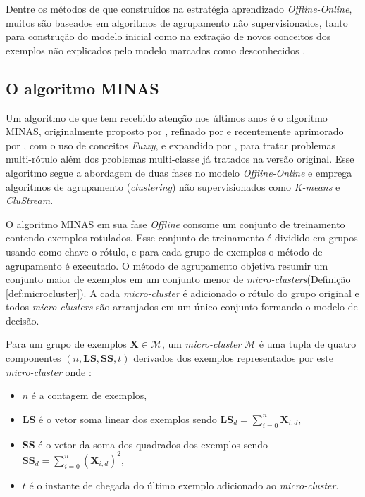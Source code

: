 Dentre os métodos de \nd que construídos na estratégia aprendizado \emph{Offline-Online},
muitos são baseados em
algoritmos de agrupamento não supervisionados, tanto
para construção do modelo inicial como na extração de novos conceitos dos
exemplos não explicados pelo modelo marcados como desconhecidos
\cite{Spinosa2009ollinda,Masud2010ECSMiner,Faria2013Minas}.

\subsection{O algoritmo MINAS}\label{sec:minas-og}

Um algoritmo de \nd que tem recebido atenção nos últimos anos é o algoritmo
MINAS, originalmente proposto por , refinado por
 e recentemente aprimorado por
, com o uso de conceitos \emph{Fuzzy}, e expandido por
, para tratar problemas multi-rótulo além dos problemas
multi-classe já tratados na versão original.
Esse algoritmo segue a abordagem de duas fases no modelo \emph{Offline-Online} e
emprega algoritmos de agrupamento (\emph{clustering}) não supervisionados como
\emph{K-means} e \emph{CluStream}.

\newcommand{\mcluster}{\emph{micro-cluster}\xspace}
\newcommand{\mclusters}{\emph{micro-clusters}\xspace}

O algoritmo MINAS em sua fase \emph{Offline} consome um conjunto de treinamento
contendo exemplos rotulados.
Esse conjunto de treinamento é dividido em grupos usando como chave o rótulo,
e para cada grupo de exemplos o método de agrupamento é executado.
O método de agrupamento objetiva resumir um conjunto maior de exemplos em um
conjunto menor de \mclusters (Definição \ref{def:microcluster}).
A cada \mcluster é adicionado o rótulo do grupo original e todos \mclusters
são arranjados em um único conjunto formando o modelo de decisão.

\begin{definition}
  Para um grupo de exemplos $\mathbf{X} \in \mathcal{M}$, um \mcluster
  $\mathcal{M}$ é uma tupla de quatro componentes $(n, \mathbf{LS}, \mathbf{SS}, t)$
  derivados dos exemplos representados por este \mcluster onde \cite{Aggarwal2003,Faria2016minas}:
  \begin{itemize}
    \item $n$ é a contagem de exemplos,
    \item $\mathbf{LS}$ é o vetor soma linear dos exemplos sendo $\mathbf{LS}_d = \sum_{i=0}^{n} \mathbf{X}_{i,d}$,
    \item $\mathbf{SS}$ é o vetor da soma dos quadrados dos exemplos sendo $\mathbf{SS}_d = \sum_{i=0}^{n} (\mathbf{X}_{i,d})^2$,
    \item $t$ é o instante de chegada do último exemplo adicionado ao \mcluster.
  \end{itemize}
  \label{def:microcluster}
\end{definition}

